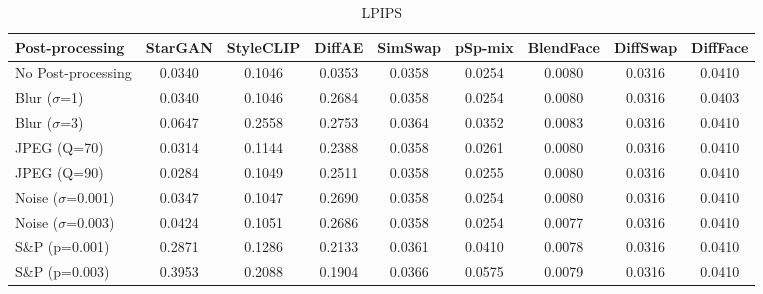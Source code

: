 \documentclass{article}
\begin{document}
\begin{table}[h!]
\begin{subtable}{\textwidth}
\caption{LPIPS}
\centering
\scriptsize
\begin{tabular}{lcccccccc}
\toprule
\textbf{Post-processing} & StarGAN & StyleCLIP & DiffAE & SimSwap & pSp-mix & BlendFace & DiffSwap & DiffFace \\
\midrule
No Post-processing & 0.0340 & 0.1046 & 0.0353 & 0.0358 & 0.0254 & 0.0080 & 0.0316 & 0.0410 \\
\midrule
Blur ($\sigma$=1) & 0.0340 & 0.1046 & 0.2684 & 0.0358 & 0.0254 & 0.0080 & 0.0316 & 0.0403 \\
Blur ($\sigma$=3) & 0.0647 & 0.2558 & 0.2753 & 0.0364 & 0.0352 & 0.0083 & 0.0316 & 0.0410 \\
JPEG (Q=70) & 0.0314 & 0.1144 & 0.2388 & 0.0358 & 0.0261 & 0.0080 & 0.0316 & 0.0410 \\
JPEG (Q=90) & 0.0284 & 0.1049 & 0.2511 & 0.0358 & 0.0255 & 0.0080 & 0.0316 & 0.0410 \\
Noise ($\sigma$=0.001) & 0.0347 & 0.1047 & 0.2690 & 0.0358 & 0.0254 & 0.0080 & 0.0316 & 0.0410 \\
Noise ($\sigma$=0.003) & 0.0424 & 0.1051 & 0.2686 & 0.0358 & 0.0254 & 0.0077 & 0.0316 & 0.0410 \\
S\&P (p=0.001) & 0.2871 & 0.1286 & 0.2133 & 0.0361 & 0.0410 & 0.0078 & 0.0316 & 0.0410 \\
S\&P (p=0.003) & 0.3953 & 0.2088 & 0.1904 & 0.0366 & 0.0575 & 0.0079 & 0.0316 & 0.0410 \\
\bottomrule
\end{tabular}
\end{subtable}


\end{table}
\end{document}
